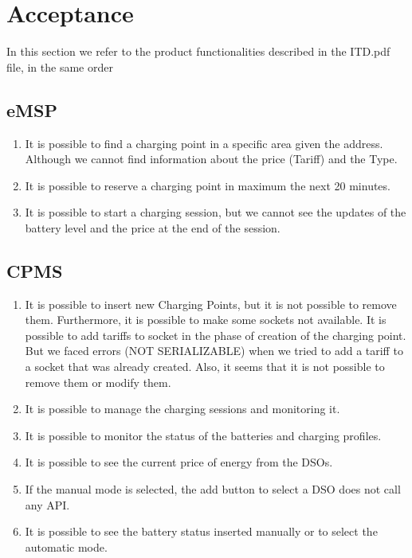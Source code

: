 \documentclass{article}
\begin{document}
\section{Acceptance}
In this section we refer to the product functionalities described in the ITD.pdf file, in the same order
\subsection{eMSP}
\begin{enumerate}
    \item It is possible to find a charging point in a specific area given the address. Although we cannot find information about the price (Tariff) and the Type.
    \item It is possible to reserve a charging point in maximum the next 20 minutes.
    \item It is possible to start a charging session, but we cannot see the updates of the battery level and the price at the end of the session.
\end{enumerate}
\subsection{CPMS}
\begin{enumerate}
    \item It is possible to insert new Charging Points, but it is not possible to remove them. Furthermore, it is possible to make some sockets not available. It is possible to add tariffs to socket in the phase of creation of the charging point. But we faced errors (NOT SERIALIZABLE) when we tried to add a tariff to a socket that was already created. Also, it seems that it is not possible to remove them or modify them.
    \item It is possible to manage the charging sessions and monitoring it.
    \item It is possible to monitor the status of the batteries and charging profiles.
    \item It is possible to see the current price of energy from the DSOs.
    \item If the manual mode is selected, the add button to select a DSO does not call any API.
    \item It is possible to see the battery status inserted manually or to select the automatic mode.
\end{enumerate}
\end{document}
